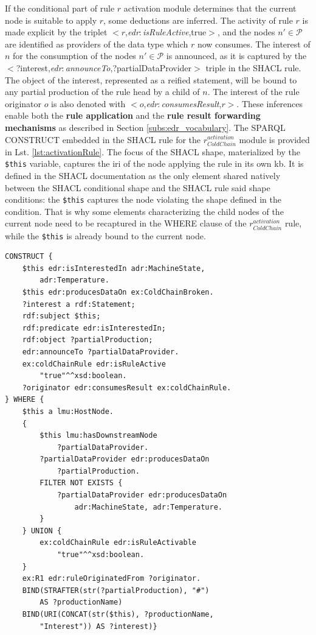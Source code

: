 \documentclass{iosart2c}
\newcommand{\namespace}[1]{\textit{#1$:$}}
\newcommand{\concept}[2]{\namespace{#1}\-\textit{#2}}
\newcommand{\triplet}[3]{$<$#1,\textit{#2},#3$>$}
\begin{document}
If the conditional part of rule $r$ activation module determines that the current node is suitable to apply $r$, some deductions are inferred. 
The activity of rule $r$ is made explicit by the triplet \triplet{$r$}{\concept{edr}{isRuleActive}}{true}, and the nodes $n'\in \mathcal{P}$ are identified as providers of the data type which $r$ now consumes. 
The interest of $n$ for the consumption of the nodes $n'\in \mathcal{P}$ is announced, as it is captured by the \triplet{?interest}{\concept{edr}{announce\-To}}{?partial\-Data\-Provider} triple in the SHACL rule.
The object of the interest, represented as a reified statement, will be bound to any partial production of the rule head by a child of $n$.
The interest of the rule originator $o$ is also denoted with \triplet{$o$}{\concept{edr}{consumes\-Result}}{$r$}.
These inferences enable both the \textbf{rule application} and the \textbf{rule result forwarding mechanisms} as described in Section \textsection \ref{subs:edr_vocabulary}.
The SPARQL CONSTRUCT embedded in the SHACL rule for the $r_{ColdChain}^{activation}$ module is provided in Lst. \ref{lst:activationRule}.
The focus of the SHACL shape, materialized by the \texttt{\$this} variable, captures the \gls{iri} of the node applying the rule in its own \gls{kb}.
It is defined in the SHACL documentation as the only element shared natively between the SHACL conditional shape and the SHACL rule said shape conditions: the \texttt{\$this} captures the node violating the shape defined in the condition. 
That is why some elements characterizing the child nodes of the current node need to be recaptured in the WHERE clause of the $r_{ColdChain}^{activation}$ rule, while the \texttt{\$this} is already bound to the current node.

\begin{lstlisting}[float, caption=$r_{ColdChain}^{activation}$ rule, label=lst:activationRule]
CONSTRUCT {
	$this edr:isInterestedIn adr:MachineState, 
		adr:Temperature.
	$this edr:producesDataOn ex:ColdChainBroken.
	?interest a rdf:Statement;
	rdf:subject $this;
	rdf:predicate edr:isInterestedIn;
	rdf:object ?partialProduction;
	edr:announceTo ?partialDataProvider.
	ex:coldChainRule edr:isRuleActive 
		"true"^^xsd:boolean.
	?originator edr:consumesResult ex:coldChainRule.
} WHERE {
	$this a lmu:HostNode.
	{
		$this lmu:hasDownstreamNode 
			?partialDataProvider.
		?partialDataProvider edr:producesDataOn 
			?partialProduction.
		FILTER NOT EXISTS {
			?partialDataProvider edr:producesDataOn
				adr:MachineState, adr:Temperature.
		}
	} UNION {
		ex:coldChainRule edr:isRuleActivable 
			"true"^^xsd:boolean.
	}
	ex:R1 edr:ruleOriginatedFrom ?originator.
	BIND(STRAFTER(str(?partialProduction), "#") 
		AS ?productionName)
	BIND(URI(CONCAT(str($this), ?productionName, 
		"Interest")) AS ?interest)}
\end{lstlisting}
\end{document}
